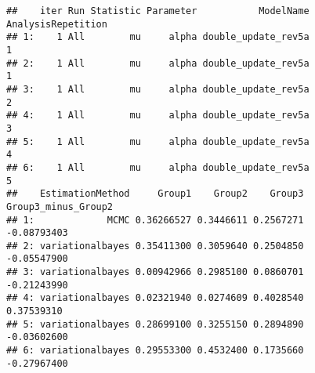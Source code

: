 \documentclass[]{article}
\newenvironment{Shaded}{\begin{snugshade}}{\end{snugshade}}
\newcommand{\KeywordTok}[1]{\textcolor[rgb]{0.13,0.29,0.53}{\textbf{{#1}}}}
\newcommand{\DataTypeTok}[1]{\textcolor[rgb]{0.13,0.29,0.53}{{#1}}}
\newcommand{\FloatTok}[1]{\textcolor[rgb]{0.00,0.00,0.81}{{#1}}}
\newcommand{\StringTok}[1]{\textcolor[rgb]{0.31,0.60,0.02}{{#1}}}
\newcommand{\CommentTok}[1]{\textcolor[rgb]{0.56,0.35,0.01}{\textit{{#1}}}}
\newcommand{\NormalTok}[1]{{#1}}
\begin{document}
\begin{verbatim}
##    iter Run Statistic Parameter           ModelName AnalysisRepetition
## 1:    1 All        mu     alpha double_update_rev5a                  1
## 2:    1 All        mu     alpha double_update_rev5a                  1
## 3:    1 All        mu     alpha double_update_rev5a                  2
## 4:    1 All        mu     alpha double_update_rev5a                  3
## 5:    1 All        mu     alpha double_update_rev5a                  4
## 6:    1 All        mu     alpha double_update_rev5a                  5
##    EstimationMethod     Group1    Group2    Group3 Group3_minus_Group2
## 1:             MCMC 0.36266527 0.3446611 0.2567271         -0.08793403
## 2: variationalbayes 0.35411300 0.3059640 0.2504850         -0.05547900
## 3: variationalbayes 0.00942966 0.2985100 0.0860701         -0.21243990
## 4: variationalbayes 0.02321940 0.0274609 0.4028540          0.37539310
## 5: variationalbayes 0.28699100 0.3255150 0.2894890         -0.03602600
## 6: variationalbayes 0.29553300 0.4532400 0.1735660         -0.27967400
\end{verbatim}

\begin{Shaded}
\end{Shaded}
\end{document}
